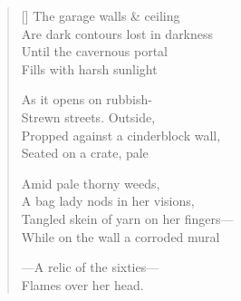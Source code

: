 \label{ch:bus_depot}
\settowidth{\versewidth}{Tangled skein of yarn on her fingers—}
\begin{verse}[\versewidth]
The garage walls \& ceiling\\
Are dark contours lost in darkness\\
Until the cavernous portal\\
Fills with harsh sunlight

As it opens on rubbish-\\
Strewn streets.     Outside,\\
Propped against a cinderblock wall,\\
Seated on a crate, pale

Amid pale thorny weeds,\\
A bag lady nods in her visions,\\
Tangled skein of yarn on her fingers---\\
While on the wall a corroded mural

---A relic of the sixties---\\
Flames over her head.
\end{verse}
